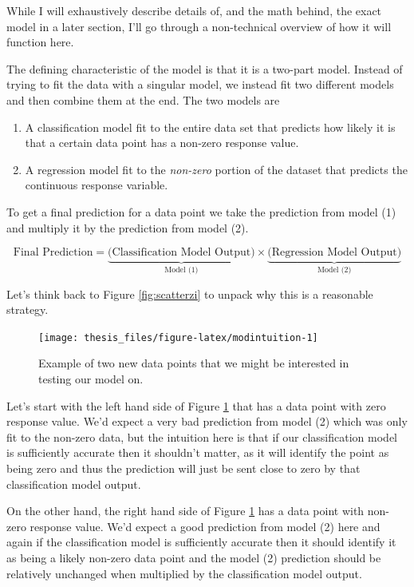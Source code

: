 \documentclass[12pt,twoside]{reedthesis}
\begin{document}
While I will exhaustively describe details of, and the math behind, the exact model in a later section, I'll go through a non-technical overview of how it will function here.

The defining characteristic of the model is that it is a two-part model. Instead of trying to fit the data with a singular model, we instead fit two different models and then combine them at the end. The two models are
\begin{enumerate}
\def\labelenumi{\arabic{enumi}.}
\item
  A classification model fit to the entire data set that predicts how likely it is that a certain data point has a non-zero response value.
\item
  A regression model fit to the \emph{non-zero} portion of the dataset that predicts the continuous response variable.
\end{enumerate}
To get a final prediction for a data point we take the prediction from model (1) and multiply it by the prediction from model (2).

\[
\text{Final Prediction} =  \underbrace{\bigg(\text{Classification Model Output}\bigg)}_{\text{Model (1)}} \times \underbrace{\bigg(\text{Regression Model Output}\bigg)}_{\text{Model (2)}} 
\]

Let's think back to Figure \ref{fig:scatterzi} to unpack why this is a reasonable strategy.
\begin{figure}

{\centering \texttt{[image: thesis\_files/figure-latex/modintuition-1]} 

}

\caption{Example of two new data points that we might be interested in testing our model on.}\label{fig:modintuition}
\end{figure}
Let's start with the left hand side of Figure \ref{fig:modintuition} that has a data point with zero response value. We'd expect a very bad prediction from model (2) which was only fit to the non-zero data, but the intuition here is that if our classification model is sufficiently accurate then it shouldn't matter, as it will identify the point as being zero and thus the prediction will just be sent close to zero by that classification model output.

On the other hand, the right hand side of Figure \ref{fig:modintuition} has a data point with non-zero response value. We'd expect a good prediction from model (2) here and again if the classification model is sufficiently accurate then it should identify it as being a likely non-zero data point and the model (2) prediction should be relatively unchanged when multiplied by the classification model output.
\end{document}

